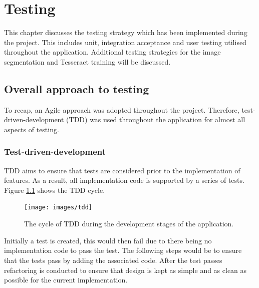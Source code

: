 \chapter{Testing}




This chapter discusses the testing strategy which has been implemented during the project. This includes unit, integration acceptance and user testing utilised throughout the application. Additional testing strategies for the image segmentation and Tesseract training will be discussed.

\section{Overall approach to testing}
To recap, an Agile approach was adopted throughout the project. Therefore, test-driven-development (TDD) was used throughout the application for almost all aspects of testing.

\subsection{Test-driven-development}
TDD aims to ensure that tests are considered prior to the implementation of features. As a result, all implementation code is supported by a series of tests. Figure \ref{fig:tdd} shows the TDD cycle.

\begin{figure}
  \texttt{[image: images/tdd]}
  \centering
  \caption{The cycle of TDD during the development stages of the application.}
  \label{fig:tdd}
\end{figure}

Initially a test is created, this would then fail due to there being no implementation code to pass the test. The following steps would be to ensure that the tests pass by adding the associated code. After the test passes refactoring is conducted to ensure that design is kept as simple and as clean as possible for the current implementation.

